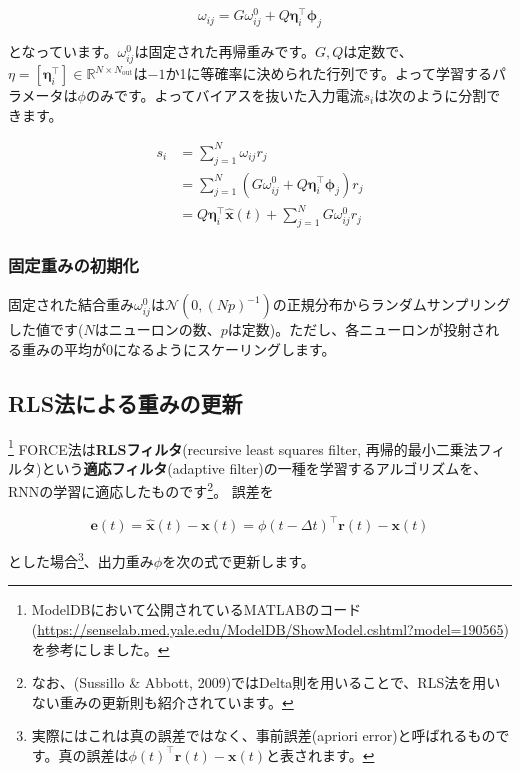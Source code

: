 \begin{equation}
\omega_{i j}=G \omega_{i j}^{0}+Q \boldsymbol{\eta}_{i}^\intercal \boldsymbol{\phi}_j 
\end{equation}


となっています。$\omega_{i j}^{0}$は固定された再帰重みです。$G, Q$は定数で、$\eta=[\boldsymbol{\eta}_{i}^\intercal]\in \mathbb{R}^{N\times N_\text{out}}$は$-1$か1に等確率に決められた行列です。よって学習するパラメータは$\phi$のみです。よってバイアスを抜いた入力電流$s_{i}$は次のように分割できます。


\begin{align}
s_{i}&=\sum_{j=1}^{N} \omega_{i j} r_{j}\\
&=\sum_{j=1}^{N} \left(G \omega_{i j}^{0}+Q \boldsymbol{\eta}_{i}^\intercal \boldsymbol{\phi}_j \right)r_{j}\\
&=Q\boldsymbol{\eta}_{i}^\intercal \hat{\boldsymbol{x}}(t)+\sum_{j=1}^{N} G \omega_{i j}^{0}r_{j}
\end{align}


\subsubsection{固定重みの初期化}
固定された結合重み$\omega_{i j}^{0}$は$\mathcal{N}(0, (Np)^{-1})$の正規分布からランダムサンプリングした値です($N$はニューロンの数、$p$は定数)。ただし、各ニューロンが投射される重みの平均が0になるようにスケーリングします。
\subsection{RLS法による重みの更新}
\footnote{ModelDBにおいて公開されているMATLABのコード(\url{https://senselab.med.yale.edu/ModelDB/ShowModel.cshtml?model=190565})を参考にしました。}
FORCE法は\textbf{RLSフィルタ}(recursive least squares filter, 再帰的最小二乗法フィルタ)という\textbf{適応フィルタ}(adaptive filter)の一種を学習するアルゴリズムを、RNNの学習に適応したものです\footnote{なお、(Sussillo \& Abbott, 2009)ではDelta則を用いることで、RLS法を用いない重みの更新則も紹介されています。}。
誤差を 


\begin{equation}
\boldsymbol{e}(t)=\hat{\boldsymbol{x}}(t)-\boldsymbol{x}(t)=\phi(t-\Delta t)^\intercal \boldsymbol{r}(t)-\boldsymbol{x}(t)    
\end{equation}


とした場合\footnote{実際にはこれは真の誤差ではなく、事前誤差(apriori error)と呼ばれるものです。真の誤差は$\phi(t)^\intercal \boldsymbol{r}(t)-\boldsymbol{x}(t)$と表されます。}、出力重み$\phi$を次の式で更新します。


